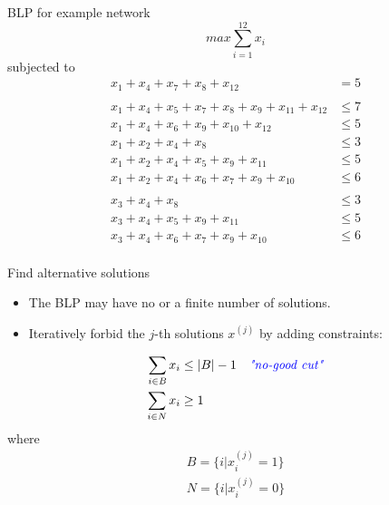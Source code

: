 \documentclass{beamer}
\begin{document}
\begin{frame}{BLP for example network}
\small
$$max \sum_{i=1}^{12} x_i$$
subjected to  
\begin{align*}
    x_1 + x_4 + x_7 + x_8 + x_{12}                      & = 5   \\
    \\
    x_1 + x_4 + x_5 + x_7 + x_8 + x_9 + x_{11} + x_{12} & \leq 7 \\
    x_1 + x_4 + x_6 + x_9 + x_{10} + x_{12}             & \leq 5 \\
    x_1 + x_2 + x_4 + x_8                               & \leq 3 \\
    x_1 + x_2 + x_4 + x_5 + x_9 + x_{11}                & \leq 5 \\
    x_1 + x_2 + x_4 + x_6 + x_7 + x_9 + x_{10}          & \leq 6 \\
    \\
    x_3 + x_4 + x_8                                     & \leq 3 \\
    x_3 + x_4 + x_5 + x_9 + x_{11}                      & \leq 5 \\
    x_3 + x_4 + x_6 + x_7 + x_9 + x_{10}                & \leq 6 \\
    \end{align*}
\end{frame}


\begin{frame}{Find alternative solutions}
\begin{itemize}
    \item The BLP may have no or a finite number of solutions.
    \item Iteratively forbid the $j$-th solutions $x^{(j)}$ by adding constraints:
\end{itemize}
    
    \begin{align*}
        \sum_{i \in B} x_i & \leq |B| -1 & 
        \text{\emph{\textcolor{blue}{"no-good cut"}}}\\
        \sum_{i \in N} x_i & \geq 1   & ~\\
    \end{align*}
    where 
    \begin{align*}
        B = \{i |x_{i}^{(j)} = 1\} \\
        N = \{i |x_{i}^{(j)} = 0\} \\
    \end{align*}

\end{frame}
\end{document}
